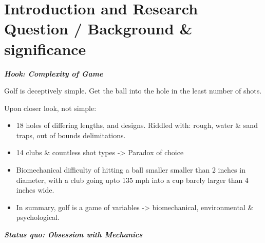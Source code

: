 \documentclass[11pt, letterpaper]{article}
\begin{document}
\newpage
\setcounter{page}{1} %

\section{Introduction and Research Question / Background \& significance}

\textbf{\emph{Hook: Complexity of Game}}

Golf is deceptively simple. Get the ball into the hole in the least number of shots. 

Upon closer look, not simple:
    \begin{itemize}
        \item 18 holes of differing lengths, and designs. Riddled with: rough, water \& sand traps, out of bounds delimitations. 
        \item 14 clubs \& countless shot types -> Paradox of choice
        \item Biomechanical difficulty of hitting a ball smaller smaller than 2 inches in diameter, with a club going upto 135 mph into a cup barely larger than 4 inches wide. 
        \item In summary, golf is a game of variables -> biomechanical, environmental \& psychological.
    \end{itemize}

\textbf{\emph{Status quo: Obsession with Mechanics}}
\end{document}
